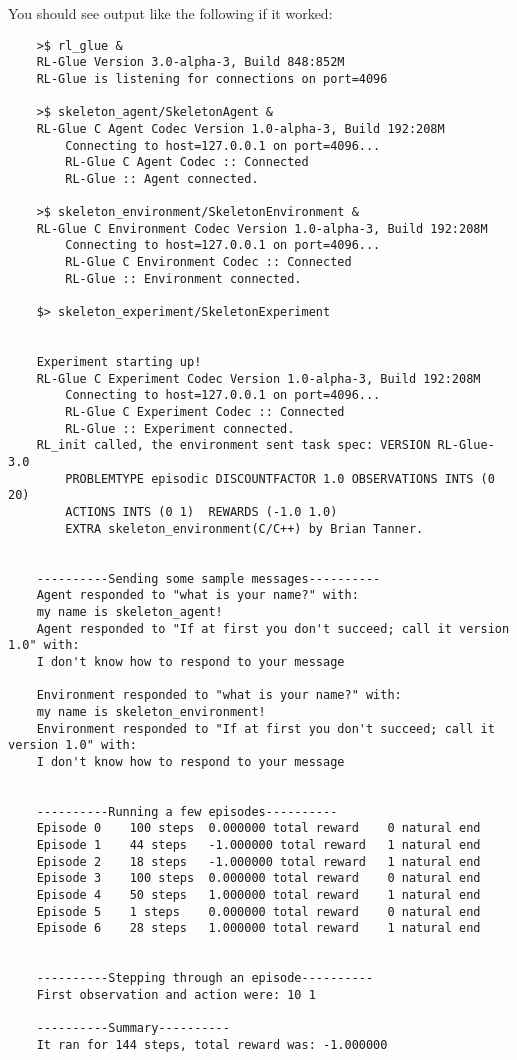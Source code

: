 \documentclass[11pt]{article}
\begin{document}
You should see output like the following if it worked:
\begin{verbatim}
	>$ rl_glue &
	RL-Glue Version 3.0-alpha-3, Build 848:852M
	RL-Glue is listening for connections on port=4096

	>$ skeleton_agent/SkeletonAgent & 
	RL-Glue C Agent Codec Version 1.0-alpha-3, Build 192:208M
		Connecting to host=127.0.0.1 on port=4096...
		RL-Glue C Agent Codec :: Connected
		RL-Glue :: Agent connected.

	>$ skeleton_environment/SkeletonEnvironment & 
	RL-Glue C Environment Codec Version 1.0-alpha-3, Build 192:208M
		Connecting to host=127.0.0.1 on port=4096...
		RL-Glue C Environment Codec :: Connected
		RL-Glue :: Environment connected.

	$> skeleton_experiment/SkeletonExperiment


	Experiment starting up!
	RL-Glue C Experiment Codec Version 1.0-alpha-3, Build 192:208M
		Connecting to host=127.0.0.1 on port=4096...
		RL-Glue C Experiment Codec :: Connected
		RL-Glue :: Experiment connected.
	RL_init called, the environment sent task spec: VERSION RL-Glue-3.0 
		PROBLEMTYPE episodic DISCOUNTFACTOR 1.0 OBSERVATIONS INTS (0 20) 
		ACTIONS INTS (0 1)  REWARDS (-1.0 1.0)  
		EXTRA skeleton_environment(C/C++) by Brian Tanner.
	

	----------Sending some sample messages----------
	Agent responded to "what is your name?" with: 
	my name is skeleton_agent!
	Agent responded to "If at first you don't succeed; call it version 1.0" with: 
	I don't know how to respond to your message

	Environment responded to "what is your name?" with: 
	my name is skeleton_environment!
	Environment responded to "If at first you don't succeed; call it version 1.0" with: 
	I don't know how to respond to your message


	----------Running a few episodes----------
	Episode 0	 100 steps 	0.000000 total reward	 0 natural end 
	Episode 1	 44 steps 	-1.000000 total reward	 1 natural end 
	Episode 2	 18 steps 	-1.000000 total reward	 1 natural end 
	Episode 3	 100 steps 	0.000000 total reward	 0 natural end 
	Episode 4	 50 steps 	1.000000 total reward	 1 natural end 
	Episode 5	 1 steps 	0.000000 total reward	 0 natural end 
	Episode 6	 28 steps 	1.000000 total reward	 1 natural end 


	----------Stepping through an episode----------
	First observation and action were: 10 1

	----------Summary----------
	It ran for 144 steps, total reward was: -1.000000
	
\end{verbatim}
\end{document}
